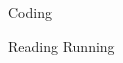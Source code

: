 



\begin{cvskills}
  \cvskill
    {Coding} %
    {}

  \cvskill
    {Reading} %
    {}
  \cvskill
    {Running} %
    {}

\end{cvskills}